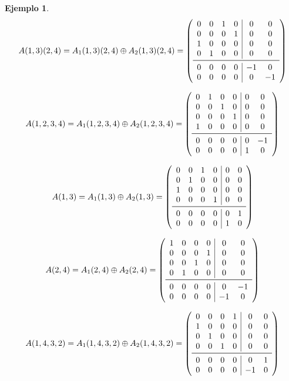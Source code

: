 \documentclass[12pt]{book}
\theoremstyle{definition}
\newtheorem{example}[theorem]{Ejemplo}
\newcounter{in}
\begin{document}
\begin{example}
\[
A(1, 3)(2, 4) =  A_{1}(1, 3)(2, 4) \oplus A_{2}(1, 3)(2, 4) =
\left( \begin{array}{cccc|cc}
0 & 0 & 1 & 0 &  0 &  0 \\
0 & 0 & 0 & 1 &  0 &  0 \\
1 & 0 & 0 & 0 &  0 &  0 \\
0 & 1 & 0 & 0 &  0 &  0 \\
\midrule
0 & 0 & 0 & 0 & -1 &  0 \\
0 & 0 & 0 & 0 &  0 & -1 \\
\end{array}\right)
\]

\[
A(1, 2, 3, 4) = A_{1}(1, 2, 3, 4) \oplus A_{2}(1, 2, 3, 4) =
\left( \begin{array}{cccc|cc}
0 & 1 & 0 & 0 & 0 &  0 \\
0 & 0 & 1 & 0 & 0 &  0 \\
0 & 0 & 0 & 1 & 0 &  0 \\
1 & 0 & 0 & 0 & 0 &  0 \\
\midrule
0 & 0 & 0 & 0 & 0 & -1 \\
0 & 0 & 0 & 0 & 1 &  0 \\
\end{array}\right)
\]

\[
A(1, 3) = A_{1}(1, 3) \oplus A_{2}(1, 3) =
\left( \begin{array}{cccc|cc}
0 & 0 & 1 & 0 & 0 & 0 \\
0 & 1 & 0 & 0 & 0 & 0 \\
1 & 0 & 0 & 0 & 0 & 0 \\
0 & 0 & 0 & 1 & 0 & 0 \\
\midrule
0 & 0 & 0 & 0 & 0 & 1 \\
0 & 0 & 0 & 0 & 1 & 0 \\
\end{array}\right)
\]

\[
A(2, 4) = A_{1}(2, 4) \oplus A_{2}(2, 4) =
\left( \begin{array}{cccc|cc}
1 & 0 & 0 & 0 &  0 &  0 \\
0 & 0 & 0 & 1 &  0 &  0 \\
0 & 0 & 1 & 0 &  0 &  0 \\
0 & 1 & 0 & 0 &  0 &  0 \\
\midrule
0 & 0 & 0 & 0 &  0 & -1 \\
0 & 0 & 0 & 0 & -1 &  0 \\
\end{array}\right)
\]

\[
A(1, 4, 3, 2) = A_{1}(1, 4, 3, 2) \oplus A_{2}(1, 4, 3, 2) =
\left( \begin{array}{cccc|cc}
0 & 0 & 0 & 1 &  0 & 0 \\
1 & 0 & 0 & 0 &  0 & 0 \\
0 & 1 & 0 & 0 &  0 & 0 \\
0 & 0 & 1 & 0 &  0 & 0 \\
\midrule
0 & 0 & 0 & 0 &  0 & 1 \\
0 & 0 & 0 & 0 & -1 & 0 \\
\end{array}\right)
\]


\end{example}
\end{document}
